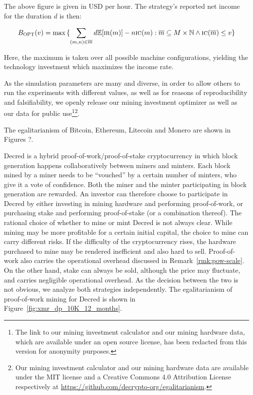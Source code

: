 The above figure is given in USD per hour. The strategy's reported net income
for the duration $d$ is then:

\[
  B_\textsc{OPT}(v)
  =
  \max{
    \{
      \sum_{(m, n) \in \overline{m}}
      {d\mathbb{E}[\textsc{ir}(m)] - n\textsc{ic}(m)}:
      \overline{m} \subseteq M \times \mathbb{N}
      \land
      \textsc{ic}(\overline{m}) \leq v
    \}
  }
\]

Here, the maximum is taken over all possible machine configurations, yielding
the technology investment which maximizes the income rate.

As the simulation parameters are many and diverse, in order to allow others to
run the experiments with different values, as well as for reasons of
reproducibility and falsifiability, we openly release our mining investment
optimizer as well as our data for public use\ifanonymous\footnote{
  The link to our mining investment calculator and our mining hardware data,
  which are available under an open source license, has been redacted from this
  version for anonymity purposes.
}\else\footnote{
  Our mining investment calculator and our mining hardware data are available
  under the MIT license and a Creative Commons 4.0 Attribution License
  respectively at \url{https://github.com/decrypto-org/egalitarianism}.
}\fi.

The egalitarianism of Bitcoin, Ethereum, Litecoin and Monero are shown in
Figures ?.

Decred is a hybrid proof-of-work/proof-of-stake cryptocurrency in which block
generation happens collaboratively between miners and minters. Each block mined
by a miner needs to be ``vouched'' by a certain number of minters, who give it a
vote of confidence. Both the miner and the minter participating in block
generation are rewarded. An investor can therefore choose to participate in
Decred by either investing in mining hardware and performing proof-of-work, or
purchasing stake and performing proof-of-stake (or a combination thereof). The
rational choice of whether to mine or mint Decred is not always clear. While
mining may be more profitable for a certain initial capital, the choice to mine
can carry different risks. If the difficulty of the cryptocurrency rises, the
hardware purchased to mine may be rendered inefficient and also hard to sell.
Proof-of-work also carries the operational overhead discussed in
Remark~\ref{rmk:pow-scale}. On the other hand, stake can always be sold,
although the price may fluctuate, and carries negligible operational overhead.
As the decision between the two is not obvious, we analyze both strategies
independently. The egalitarianism of proof-of-work mining for Decred is shown in
Figure~\ref{fig:xmr_dp_10K_12_months}.

